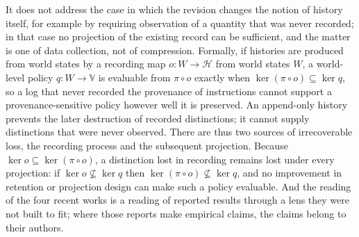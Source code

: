 \documentclass[11pt]{article}
\theoremstyle{remark}
\newcommand{\Hist}{\mathcal{H}}
\newcommand{\Vset}{\mathbb{V}}
\renewcommand{\ker}{\operatorname{ker}}
\begin{document}
It does not address the case in which the revision changes the notion of history itself, for example by requiring observation of a quantity that was never recorded; in that case no projection of the existing record can be sufficient, and the matter is one of data collection, not of compression. Formally, if histories are produced from world states by a recording map $o:W\to\Hist$ from world states $W$, a world-level policy $q:W\to\Vset$ is evaluable from $\pi\circ o$ exactly when $\ker(\pi\circ o)\subseteq\ker q$, so a log that never recorded the provenance of instructions cannot support a provenance-sensitive policy however well it is preserved. An append-only history prevents the later destruction of recorded distinctions; it cannot supply distinctions that were never observed. There are thus two sources of irrecoverable loss, the recording process and the subsequent projection. Because $\ker o\subseteq\ker(\pi\circ o)$, a distinction lost in recording remains lost under every projection: if $\ker o\not\subseteq\ker q$ then $\ker(\pi\circ o)\not\subseteq\ker q$, and no improvement in retention or projection design can make such a policy evaluable. And the reading of the four recent works is a reading of reported results through a lens they were not built to fit; where those reports make empirical claims, the claims belong to their authors.
\end{document}
